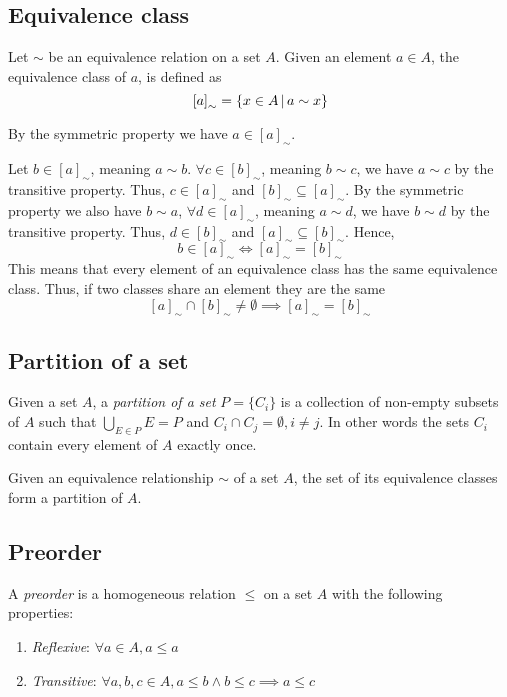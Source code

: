 \documentclass{article}
\begin{document}
\subsection{Equivalence class}

Let \(\sim\) be an equivalence relation on a set \(A\).
Given an element \(a\in A\), the equivalence class of \(a\), is defined as
\[
    {[a]}_{\sim} = \{x \in A \,|\, a \sim x\}
\]

By the symmetric property we have \(a \in {[a]}_{\sim}\).

Let \(b \in {[a]}_{\sim}\), meaning \(a \sim b\). \(\forall c \in {[b]}_{\sim}\),
meaning \(b \sim c\), we have \(a \sim c\) by the transitive property.
Thus, \(c \in {[a]}_{\sim}\) and \({[b]}_{\sim} \subseteq {[a]}_{\sim}\).
By the symmetric property we also have \(b \sim a\),
\(\forall d \in {[a]}_{\sim}\), meaning \(a \sim d\), we have
\(b \sim d\) by the transitive property. Thus, \(d \in {[b]}_{\sim}\)
and \({[a]}_{\sim} \subseteq {[b]}_{\sim}\). Hence,
\[
    b \in {[a]}_{\sim} \iff {[a]}_{\sim} = {[b]}_{\sim}
\]
This means that every element of an equivalence class has the same equivalence class.
Thus, if two classes share an element they are the same
\[
    {[a]}_{\sim} \cap {[b]}_{\sim} \neq \emptyset
    \implies {[a]}_{\sim} = {[b]}_{\sim}
\]

\subsection{Partition of a set}

Given a set \(A\), a \textit{partition of a set} \(P=\{C_i\}\) is a collection of
non-empty subsets of \(A\) such that \(\bigcup_{E\in P} E = P\) and
\(C_i \cap C_j = \emptyset, i \neq j\). In other words the sets \(C_i\)
contain every element of \(A\) exactly once.

Given an equivalence relationship \(\sim\) of a set \(A\),
the set of its equivalence classes form a partition of \(A\).

\subsection{Preorder}

A \textit{preorder} is a homogeneous relation \(\leq\) on a set \(A\)
with the following properties:
\begin{enumerate}
    \item \textit{Reflexive}: \(\forall a \in A, a \leq a\)
    \item \textit{Transitive}: \(\forall a,b,c \in A, a \leq b \land b \leq c \implies a \leq c\)
\end{enumerate}
\end{document}
